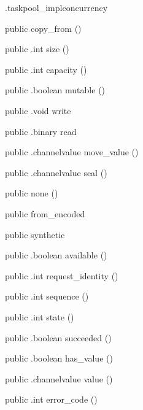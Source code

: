 \begin{CrexxClass}{.taskpool\_impl}{concurrency}
\begin{Members}
    \Factory
      {public}
      {copy\_from}
      {()}

    \Method
      {public}
      {.int}
      {size}
      {()}

    \Method
      {public}
      {.int}
      {capacity}
      {()}

    \Method
      {public}
      {.boolean}
      {mutable}
      {()}

    \Method
      {public}
      {.void}
      {write}
      {}

    \Method
      {public}
      {.binary}
      {read}
      {}

    \Method
      {public}
      {.channelvalue}
      {move\_value}
      {()}

    \Method
      {public}
      {.channelvalue}
      {seal}
      {()}

    \Factory
      {public}
      {none}
      {()}

    \Factory
      {public}
      {from\_encoded}
      {}

    \Factory
      {public}
      {synthetic}
      {}

    \Method
      {public}
      {.boolean}
      {available}
      {()}

    \Method
      {public}
      {.int}
      {request\_identity}
      {()}

    \Method
      {public}
      {.int}
      {sequence}
      {()}

    \Method
      {public}
      {.int}
      {state}
      {()}

    \Method
      {public}
      {.boolean}
      {succeeded}
      {()}

    \Method
      {public}
      {.boolean}
      {has\_value}
      {()}

    \Method
      {public}
      {.channelvalue}
      {value}
      {()}

    \Method
      {public}
      {.int}
      {error\_code}
      {()}


\end{Members}
\end{CrexxClass}
